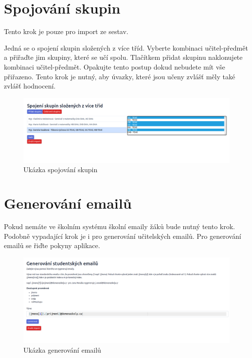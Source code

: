 \section{Spojování skupin}
Tento krok je pouze pro import ze sestav.

Jedná se o spojení skupin složených z více tříd. Vyberte kombinaci učitel-předmět a přiřaďte jim skupiny, které se učí spolu. Tlačítkem přidat skupinu naklonujete kombinaci učitel-předmět. Opakujte tento postup dokud nebudete mít vše přiřazeno. Tento krok je nutný, aby úvazky, které jsou učeny zvlášť měly také zvlášť hodnocení.

\begin{figure}[H]
    \centering
    \includegraphics[width=1\linewidth]{Figures/spojovani-skupin.png}
    \caption{Ukázka spojování skupin}
    \label{fig:spojování-skupin}
\end{figure}

\section{Generování emailů}
Pokud nemáte ve školním systému školní emaily žáků bude nutný tento krok. Podobně vypadající krok je i pro generování učitelských emailů. Pro generování emailů se řiďte pokyny aplikace.

\begin{figure}[H]
    \centering
    \includegraphics[width=1\linewidth]{Figures/generovani-emailu.png}
    \caption{Ukázka generování emailů}
    \label{fig:generovani-emailu}
\end{figure}


